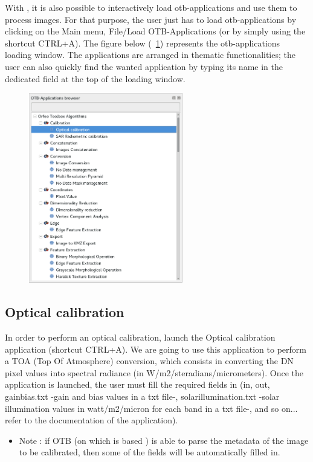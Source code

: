 With \mont, it is also possible to interactively load otb-applications and use them to process images.
For that purpose, the user just has to load otb-applications by clicking on the Main menu, File/Load OTB-Applications (or by simply using the shortcut CTRL+A).
The figure below (~\ref{fig:applications}) represents the otb-applications loading window. The applications are arranged in thematic functionalities; the user can also quickly find the wanted application by typing its name in the dedicated field
at the top of the loading window.


\begin{figure}[!h] 
  \center
  \includegraphics[width=0.6\textwidth]{../Art/MonteverdiImages/applications.png}
  \label{fig:applications}
\end{figure}


\subsection{Optical calibration}\label{ssec:monoptical}

In order to perform an optical calibration, launch the Optical calibration application (shortcut CTRL+A). 
We are going to use this application to perform a TOA (Top Of Atmosphere) conversion, which consists in converting the DN pixel values into spectral radiance (in W/m2/steradians/micrometers).
Once the application is launched, the user must fill the required fields in
(in, out, gainbias.txt -gain and bias values in a txt file-, solarillumination.txt -solar illumination values in watt/m2/micron for each band in a txt file-, and so on... refer to the documentation of the application).
\begin{itemize}
\item Note : if OTB (on which is based \mont) is able to parse the metadata of the image to be calibrated, then some of the fields will be automatically filled in.
\end{itemize}

